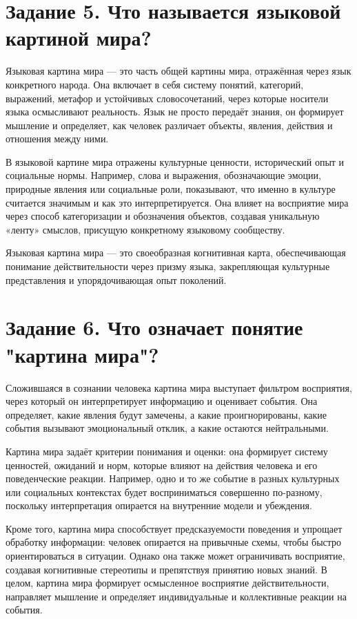 \documentclass[14pt,a4paper]{extarticle}
\begin{document}
\section{Задание 5. Что называется языковой картиной мира?}
\begin{sloppypar}
Языковая картина мира — это часть общей картины мира, отражённая через язык
    конкретного народа. Она включает в себя систему понятий, категорий,
    выражений, метафор и устойчивых словосочетаний, через которые носители
    языка осмысливают реальность. Язык не просто передаёт знания, он формирует
    мышление и определяет, как человек различает объекты, явления, действия и
    отношения между ними.

    В языковой картине мира отражены культурные ценности, исторический опыт и
    социальные нормы. Например, слова и выражения, обозначающие эмоции,
    природные явления или социальные роли, показывают, что именно в культуре
    считается значимым и как это интерпретируется. Она влияет на восприятие
    мира через способ категоризации и обозначения объектов, создавая уникальную
    «ленту» смыслов, присущую конкретному языковому сообществу.

    Языковая картина мира — это своеобразная когнитивная карта,
    обеспечивающая понимание действительности через призму языка, закрепляющая
    культурные представления и упорядочивающая опыт поколений.
\end{sloppypar}


\section{Задание 6. Что означает понятие "картина мира"?}
\begin{sloppypar}
Сложившаяся в сознании человека картина мира выступает фильтром восприятия,
    через который он интерпретирует информацию и оценивает события. Она
    определяет, какие явления будут замечены, а какие проигнорированы, какие
    события вызывают эмоциональный отклик, а какие остаются нейтральными.

    Картина мира задаёт критерии понимания и оценки: она формирует систему
    ценностей, ожиданий и норм, которые влияют на действия человека и его
    поведенческие реакции. Например, одно и то же событие в разных культурных
    или социальных контекстах будет восприниматься совершенно по-разному,
    поскольку интерпретация опирается на внутренние модели и убеждения.

    Кроме того, картина мира способствует предсказуемости поведения и упрощает
    обработку информации: человек опирается на привычные схемы, чтобы быстро
    ориентироваться в ситуации. Однако она также может ограничивать восприятие,
    создавая когнитивные стереотипы и препятствуя принятию новых знаний. В
    целом, картина мира формирует осмысленное восприятие действительности,
    направляет мышление и определяет индивидуальные и коллективные реакции на
    события.
\end{sloppypar}
\end{document}

